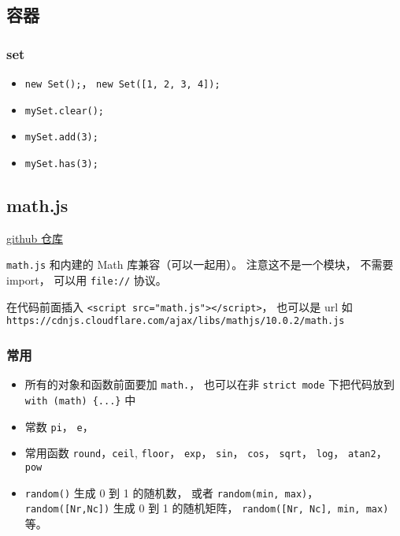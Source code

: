 \subsection{容器}
\subsubsection{set}
\begin{itemize}
\item \verb`new Set();`， \verb`new Set([1, 2, 3, 4]);`
\item \verb`mySet.clear();`
\item \verb`mySet.add(3);`
\item \verb`mySet.has(3);`
\end{itemize}


\subsection{math.js}
\href{https://github.com/josdejong/mathjs}{github 仓库}

\verb`math.js` 和内建的 Math 库兼容（可以一起用）。 注意这不是一个模块， 不需要 import， 可以用 \verb`file://` 协议。

在代码前面插入 \verb`<script src="math.js"></script>`， 也可以是 url 如 \verb`https://cdnjs.cloudflare.com/ajax/libs/mathjs/10.0.2/math.js`

\subsubsection{常用}
\begin{itemize}
\item 所有的对象和函数前面要加 \verb`math.`， 也可以在非 \verb`strict mode` 下把代码放到 \verb`with (math) {...}` 中
\item 常数 \verb`pi`， \verb`e`， 
\item 常用函数 \verb`round`，\verb`ceil`, \verb`floor`， \verb`exp`， \verb`sin`， \verb`cos`， \verb`sqrt`， \verb`log`， \verb`atan2`， \verb`pow`
\item \verb`random()` 生成 0 到 1 的随机数， 或者 \verb`random(min, max)`， \verb`random([Nr,Nc])` 生成 0 到 1 的随机矩阵， \verb`random([Nr, Nc], min, max)` 等。
\end{itemize}

